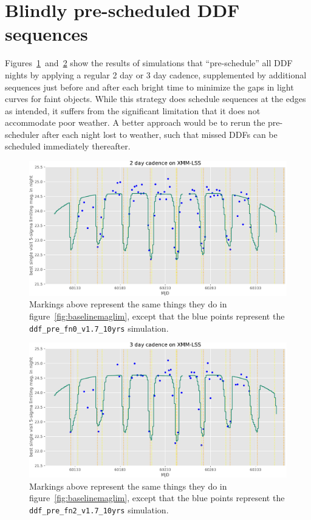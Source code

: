 \documentclass[DM,authoryear,toc]{lsstdoc}
\begin{document}
\section{Blindly pre-scheduled DDF sequences}

Figures~\ref{fig:prefn0maglim}~and~\ref{fig:prefn2maglim} show the results of simulations that ``pre-schedule'' all DDF nights by applying a regular 2 day or 3 day cadence, supplemented by additional sequences just before and after each bright time to minimize the gaps in light curves for faint objects.
While this strategy does schedule sequences at the edges as intended, it suffers from the significant limitation that it does not accommodate poor weather.
A better approach would be to rerun the pre-scheduler after each night lost to weather, such that missed DDFs can be scheduled immediately thereafter.

\begin{figure}
\centering
\includegraphics[width=\linewidth]{figures/ddf_pre_fn0_v1_7_10yrs_xmmlss.pdf}
\caption{\label{fig:prefn0maglim}
  Markings above represent the same things they do in figure~\ref{fig:baselinemaglim}, except that the blue points represent the \texttt{ddf\_pre\_fn0\_v1.7\_10yrs} simulation.
}
\end{figure}

\begin{figure}
\centering
\includegraphics[width=\linewidth]{figures/ddf_pre_fn2_v1_7_10yrs_xmmlss.pdf}
\caption{\label{fig:prefn2maglim}
  Markings above represent the same things they do in figure~\ref{fig:baselinemaglim}, except that the blue points represent the \texttt{ddf\_pre\_fn2\_v1.7\_10yrs} simulation.
}
\end{figure}
\end{document}
